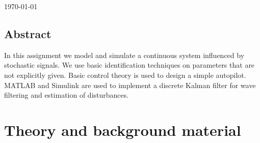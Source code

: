 \documentclass[12pt, a4paper]{article}%
\begin{document}
\begin{titlepage}


\vfill %
{\large \today}\\[2cm] %



\end{titlepage}

\newpage
{}
\begin{centering}
\section{Abstract}
In this assignment we model and simulate a continuous system influenced by stochastic signals. We use basic identification techniques on parameters that are not explicitly given.
Basic control theory is used to design a simple autopilot. MATLAB and Simulink are used to implement a discrete Kalman filter for wave filtering and estimation of disturbances.
\end{centering}

\newpage
\tableofcontents

\newpage
{}
\section{Theory and background material}
\end{document}
